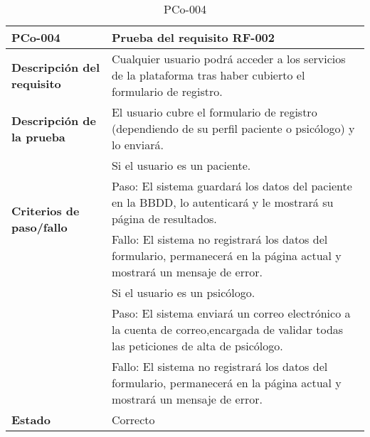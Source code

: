 \begin{table}[htpb]
\centering
\begin{tabularx}{\textwidth}{|l|X|}
\hline
\rowcolor[gray]{0.9}\textbf{PCo-004}                                    & \textbf{Prueba del requisito RF-002}                                                                                                                                                                                                                                                                                                     \\ \hline
\textbf{Descripción del requisito}                & Cualquier usuario podrá acceder a los servicios de la plataforma tras haber cubierto el formulario de registro.                                                                                                                                                                                                                          \\ \hline
\textbf{Descripción de la prueba}                 & El usuario cubre el formulario de registro (dependiendo de su perfil paciente o psicólogo) y lo enviará.                                                                                                                                                                                                                                  \\ \hline
\multirow{3}{*}{\textbf{Criterios de paso/fallo}}  & Si el usuario es un paciente. \\ 
                                                   & Paso: El sistema guardará los datos del paciente en la BBDD, lo autenticará y le mostrará su página de resultados. \\ 
                                                   & Fallo: El sistema no registrará los datos del formulario, permanecerá en la página actual y mostrará un mensaje de error.  \\ \cline{2-2}
                                                   & Si el usuario es un psicólogo. \\ 
                                                   &                                              Paso: El sistema enviará un correo electrónico a la cuenta de correo,encargada de validar todas las peticiones de alta de psicólogo.\\ 
                                                   & Fallo: El sistema no registrará los datos del formulario, permanecerá en la página actual y mostrará un mensaje de error. \\ \hline
\textbf{Estado}                                   & Correcto                                                                                                                                                                                                                                                                                                                                 \\ \hline
\end{tabularx}
\caption{PCo-004}
\end{table}


